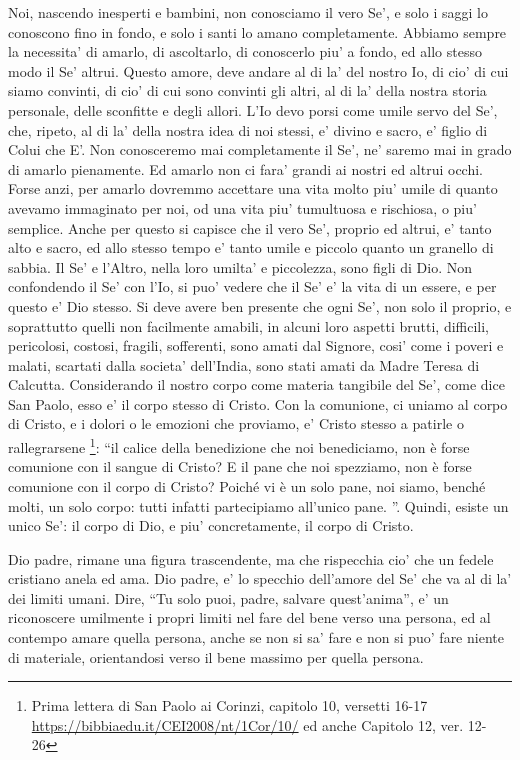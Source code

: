 Noi, nascendo inesperti e bambini, non conosciamo il vero Se', e solo i saggi lo conoscono fino in fondo, e solo i santi lo amano completamente. Abbiamo sempre la necessita' di amarlo, di ascoltarlo, di conoscerlo piu' a fondo, ed allo stesso modo il Se' altrui.  Questo amore, deve andare al di la' del nostro Io, di cio' di cui siamo convinti, di cio' di cui sono convinti gli altri, al di la' della nostra storia personale, delle sconfitte e degli allori. L'Io devo porsi come umile servo del Se', che, ripeto, al di la' della nostra idea di noi stessi, e' divino e sacro, e' figlio di Colui che E'. Non conosceremo mai completamente il Se', ne' saremo mai in grado di amarlo pienamente. Ed amarlo non ci fara' grandi ai nostri ed altrui occhi. Forse anzi, per amarlo dovremmo accettare una vita molto piu' umile di quanto avevamo immaginato per noi, od una vita piu' tumultuosa e rischiosa, o piu' semplice. Anche per questo si capisce che il vero Se', proprio ed altrui, e' tanto alto e sacro, ed allo stesso tempo e' tanto umile e piccolo quanto un granello di sabbia. Il Se' e l'Altro, nella loro umilta' e piccolezza, sono figli di Dio. Non confondendo il Se' con l'Io, si puo' vedere che il Se' e' la vita di un essere, e per questo e' Dio stesso. Si deve avere ben presente che ogni Se', non solo il proprio, e soprattutto quelli non facilmente amabili, in alcuni loro aspetti brutti, difficili, pericolosi, costosi, fragili, sofferenti, sono amati dal Signore, cosi' come i poveri e malati, scartati dalla societa' dell'India, sono stati amati da Madre Teresa di Calcutta.
Considerando il nostro corpo come materia tangibile del Se', come dice San Paolo, esso e' il corpo stesso di Cristo. Con la comunione, ci uniamo al corpo di Cristo, e i dolori o le emozioni che proviamo, e' Cristo stesso a patirle o rallegrarsene \footnote{Prima lettera di San Paolo ai Corinzi, capitolo 10, versetti 16-17 \url{https://bibbiaedu.it/CEI2008/nt/1Cor/10/} ed anche Capitolo 12, ver. 12-26}: ``il calice della benedizione che noi benediciamo, non è forse comunione con il sangue di Cristo? E il pane che noi spezziamo, non è forse comunione con il corpo di Cristo? Poiché vi è un solo pane, noi siamo, benché molti, un solo corpo: tutti infatti partecipiamo all'unico pane. ''.
Quindi, esiste un unico Se': il corpo di Dio, e piu' concretamente, il corpo di Cristo.

Dio padre, rimane una figura trascendente, ma che rispecchia cio' che un fedele cristiano anela ed ama. Dio padre, e' lo specchio dell'amore del Se' che va al di la' dei limiti umani. Dire, ``Tu solo puoi, padre, salvare quest'anima'', e' un riconoscere umilmente i propri limiti nel fare del bene verso una persona, ed al contempo amare quella persona, anche se non si sa' fare e non si puo' fare niente di materiale, orientandosi verso il bene massimo per quella persona.

